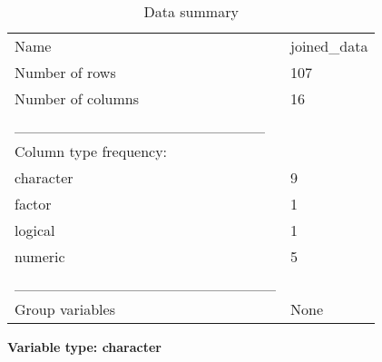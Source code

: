 \documentclass[
]{article}
\begin{document}
\begin{longtable}[]{@{}ll@{}}
\caption{Data summary}\tabularnewline
\toprule\noalign{}
\endfirsthead
\endhead
\bottomrule\noalign{}
\endlastfoot
Name & joined\_data \\
Number of rows & 107 \\
Number of columns & 16 \\
\_\_\_\_\_\_\_\_\_\_\_\_\_\_\_\_\_\_\_\_\_\_\_ & \\
Column type frequency: & \\
character & 9 \\
factor & 1 \\
logical & 1 \\
numeric & 5 \\
\_\_\_\_\_\_\_\_\_\_\_\_\_\_\_\_\_\_\_\_\_\_\_\_ & \\
Group variables & None \\
\end{longtable}

\textbf{Variable type: character}
\end{document}
